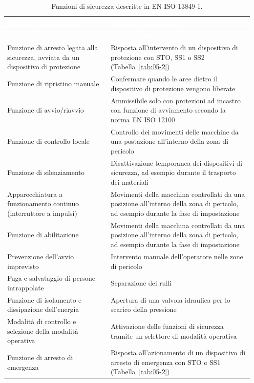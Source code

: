\begin{longtable}{|p{5.8cm}|p{\dimexpr\textwidth-5.8cm-4\tabcolsep-4\arrayrulewidth\relax}|}
    \caption{Funzioni di sicurezza descritte in EN ISO 13849-1.}
    \label{tab:05-1} \\
    \hline
    \rowcolor{tabblue}
    \textcolor{white}{\textbf{Funzione di sicurezza}} & \textcolor{white}{\textbf{Esempio applicativo}} \\
    \hline
    \endfirsthead
    \hline
    \rowcolor{tabblue}
    \textcolor{white}{\textbf{Funzione di sicurezza}} & \textcolor{white}{\textbf{Esempio applicativo}} \\
    \hline
    \endhead
    \hline
    \endfoot
    Funzione di arresto legata alla sicurezza, avviata da un dispositivo di protezione &
    Risposta all'intervento di un dispositivo di protezione con STO, SS1 o SS2 (Tabella~\ref{tab:05-2}) \\
    \hline
    \rowcolor{black!8}
    Funzione di ripristino manuale &
    Confermare quando le aree dietro il dispositivo di protezione vengono liberate \\
    \hline
    Funzione di avvio/riavvio &
    Ammissibile solo con protezioni ad incastro con funzione di avviamento secondo la norma EN ISO 12100 \\
    \hline
    \rowcolor{black!8}
    Funzione di controllo locale &
    Controllo dei movimenti delle macchine da una postazione all'interno della zona di pericolo \\
    \hline
    Funzione di silenziamento &
    Disattivazione temporanea dei dispositivi di sicurezza, ad esempio durante il trasporto dei materiali \\
    \hline
    \rowcolor{black!8}
    Apparecchiatura a funzionamento continuo (interruttore a impulsi) &
    Movimenti della macchina controllati da una posizione all'interno della zona di pericolo, ad esempio durante la fase di impostazione \\
    \hline
    Funzione di abilitazione &
    Movimenti della macchina controllati da una posizione all'interno della zona di pericolo, ad esempio durante la fase di impostazione \\
    \hline
    \rowcolor{black!8}
    Prevenzione dell'avvio imprevisto &
    Intervento manuale dell'operatore nelle zone di pericolo \\
    \hline
    Fuga e salvataggio di persone intrappolate &
    Separazione dei rulli \\
    \hline
    \rowcolor{black!8}
    Funzione di isolamento e dissipazione dell'energia &
    Apertura di una valvola idraulica per lo scarico della pressione \\
    \hline
    Modalità di controllo e selezione della modalità operativa &
    Attivazione delle funzioni di sicurezza tramite un selettore di modalità operativa \\
    \hline
    \rowcolor{black!8}
    Funzione di arresto di emergenza &
    Risposta all'azionamento di un dispositivo di arresto di emergenza con STO o SS1 (Tabella~\ref{tab:05-2}) \\
    \hline
\end{longtable}
\endgroup

